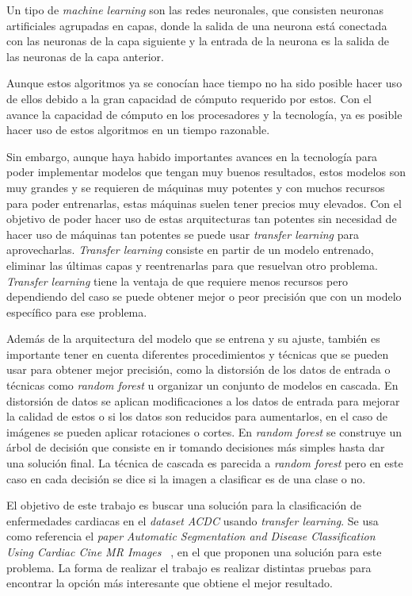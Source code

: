 \documentclass[12pt,a4paper]{article}
\begin{document}
Un tipo de \textit{machine learning} son las redes neuronales, que consisten neuronas artificiales \cite{wiki:ann} agrupadas en capas, donde la salida de una neurona está conectada con las neuronas de la capa siguiente y la entrada de la neurona es la salida de las neuronas de la capa anterior.
\bigskip

Aunque estos algoritmos ya se conocían hace tiempo no ha sido posible hacer uso de ellos debido a la gran capacidad de cómputo requerido por estos. Con el avance la capacidad de cómputo en los procesadores y la tecnología, ya es posible hacer uso de estos algoritmos en un tiempo razonable.
\bigskip

Sin embargo, aunque haya habido importantes avances en la tecnología para poder implementar modelos que tengan muy buenos resultados, estos modelos son muy grandes y se requieren de máquinas muy potentes y con muchos recursos para poder entrenarlas, estas máquinas suelen tener precios muy elevados. Con el objetivo de poder hacer uso de estas arquitecturas tan potentes sin necesidad de hacer uso de máquinas tan potentes se puede usar \textit{transfer learning} para aprovecharlas. \textit{Transfer learning} \cite{wiki:tl} consiste en partir de un modelo entrenado, eliminar las últimas capas y reentrenarlas para que resuelvan otro problema. \textit{Transfer learning} tiene la ventaja de que requiere menos recursos pero dependiendo del caso se puede obtener mejor o peor precisión que con un modelo específico para ese problema. 
\bigskip

Además de la arquitectura del modelo que se entrena y su ajuste, también es importante tener en cuenta diferentes procedimientos y técnicas que se pueden usar para obtener mejor precisión, como la distorsión de los datos de entrada o técnicas como \textit{random forest} u organizar un conjunto de modelos en cascada. En distorsión de datos se aplican modificaciones a los datos de entrada para mejorar la calidad de estos o si los datos son reducidos para aumentarlos, en el caso de imágenes se pueden aplicar rotaciones o cortes. En \textit{random forest} \cite{wiki:rf} se construye un árbol de decisión que consiste en ir tomando decisiones más simples hasta dar una solución final. La técnica de cascada \cite{wiki:cc} es parecida a \textit{random forest} pero en este caso en cada decisión se dice si la imagen a clasificar es de una clase o no.
\bigskip

El objetivo de este trabajo es buscar una solución para la clasificación de enfermedades cardiacas en el \textit{dataset} \textit{ACDC} \cite{acdcdataset} usando \textit{transfer learning}. Se usa como referencia el \textit{paper} \textit{Automatic Segmentation and Disease Classification Using Cardiac Cine MR Images} ~\cite{DBLP:journals/corr/abs-1708-01141}, en el que proponen una solución para este problema. La forma de realizar el trabajo es realizar distintas pruebas para encontrar la opción más interesante que obtiene el mejor resultado.
\bigskip
\end{document}
